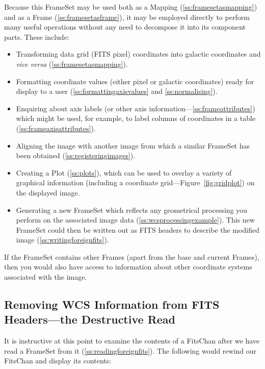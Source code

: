 \documentclass[twoside,11pt]{article}
\newcommand{\secref}[1]{\S\ref{#1}}
\renewcommand{\secref}[1]{\ref{#1}}
\begin{document}
Because this FrameSet may be used both as a Mapping
(\secref{ss:framesetasmapping}) and as a Frame
(\secref{ss:framesetasframe}), it may be employed directly to perform
many useful operations without any need to decompose it into its
component parts. These include:

\begin{itemize}
\item Transforming data grid (FITS pixel) coordinates into galactic
coordinates and {\em{vice versa}} (\secref{ss:framesetasmapping}).

\item Formatting coordinate values (either pixel or galactic
coordinates) ready for display to a user
(\secref{ss:formattingaxisvalues} and \secref{ss:normalising}).

\item Enquiring about axis labels (or other axis
information---\secref{ss:frameattributes}) which might be used, for
example, to label columns of coordinates in a table
(\secref{ss:frameaxisattributes}).

\item Aligning the image with another image from which a similar
FrameSet has been obtained (\secref{ss:registeringimages}).

\item Creating a Plot (\secref{ss:plots}), which can be used to overlay
a variety of graphical information (including a coordinate
grid---Figure~\ref{fig:gridplot}) on the displayed image.

\item Generating a new FrameSet which reflects any geometrical
processing you perform on the associated image data
(\secref{ss:wcsprocessingexample}). This new FrameSet could then be
written out as FITS headers to describe the modified image
(\secref{ss:writingforeignfits}).
\end{itemize}

If the FrameSet contains other Frames (apart from the base and current
Frames), then you would also have access to information about other
coordinate systems associated with the image.

\subsection{\label{ss:destructiveread}Removing WCS Information from FITS Headers---the Destructive Read}

It is instructive at this point to examine the contents of a FitsChan
after we have read a FrameSet from it
(\secref{ss:readingforeignfits}). The following would rewind our
FitsChan and display its contents:
\end{document}
